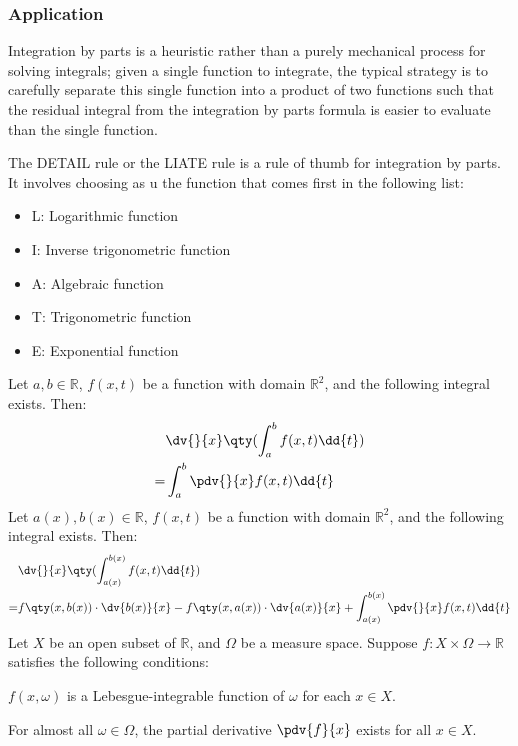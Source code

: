 \documentclass[a4paper,12pt]{report}
\begin{document}
\subsubsection{Application}
Integration by parts is a heuristic rather than a purely mechanical process for solving integrals; given a single function to integrate, the typical strategy is to carefully separate this single function into a product of two functions such that the residual integral from the integration by parts formula is easier to evaluate than the single function.

The DETAIL rule or the LIATE rule is a rule of thumb for integration by parts. It involves choosing as u the function that comes first in the following list:
\begin{itemize}
\item L: Logarithmic function
\item I: Inverse trigonometric function
\item A: Algebraic function
\item T: Trigonometric function
\item E: Exponential function
\end{itemize}
Let $a,b\in\mathbb{R}$, $f(x,t)$ be a function with domain $\mathbb{R}^2$, and the following integral exists. Then:
\[\begin{aligned}
&\dv{}{x}\qty(\int_a^bf(x,t)\dd{t})\\
=&\int_a^b\pdv{}{x}f(x,t)\dd{t}
\end{aligned}\]
Let $a(x),b(x)\in\mathbb{R}$, $f(x,t)$ be a function with domain $\mathbb{R}^2$, and the following integral exists. Then:
\[\begin{aligned}
&\dv{}{x}\qty(\int_{a(x)}^{b(x)}f(x,t)\dd{t})\\
=&f\qty(x,b(x))\cdot\dv{b(x)}{x}-f\qty(x,a(x))\cdot\dv{a(x)}{x}+\int_{a(x)}^{b(x)}\pdv{}{x}f(x,t)\dd{t}
\end{aligned}\]
Let $X$ be an open subset of $\mathbb{R}$, and $\Omega$ be a measure space. Suppose $f\colon X\times\Omega\to\mathbb{R}$ satisfies the following conditions:
\ben
\item $f(x,\omega)$ is a Lebesgue-integrable function of $\omega$ for each $x\in X$.
\item For almost all $\omega\in\Omega$, the partial derivative $\pdv{f}{x}$ exists for all $x\in X$.
\end{document}
